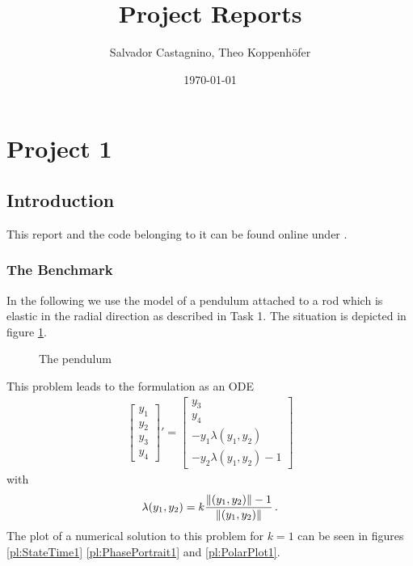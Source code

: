 \documentclass{report}
\title{Project Reports}
\author{Salvador Castagnino, Theo Koppenhöfer}
\date{\today}
\DeclarePairedDelimiter{\norm}{\lVert}{\rVert}
\newcommand{\vect}[1]{\begin{bmatrix} #1 \end{bmatrix}}
\begin{document}
\maketitle

\chapter*{Project 1}

\section*{Introduction}

This report and the code belonging to it can be found online under \cite{Repository}.

\subsection*{The Benchmark}

In the following we use the model of a pendulum attached to a rod which is elastic in the radial direction as described in Task 1. The situation is depicted in figure \ref{dr:Pendulum}. 

\begin{figure}
\centering

\caption{The pendulum}
\label{dr:Pendulum}
\end{figure}

This problem leads to the formulation as an ODE
\begin{align*}
	\vect{y_1 \\ y_2 \\ y_3 \\ y_4}' = \vect{y_3 \\ y_4 \\ -y_1\lambda(y_1,y_2) \\ -y_2\lambda(y_1,y_2)-1}
\end{align*}
with
\begin{align*}
	\lambda(y_1,y_2)=k\frac{\norm{(y_1,y_2)}-1}{\norm{(y_1,y_2)}}\,.
\end{align*}
The plot of a numerical solution to this problem for $k=1$ can be seen in figures \ref{pl:StateTime1} \ref{pl:PhasePortrait1} and \ref{pl:PolarPlot1}.
\end{document}
